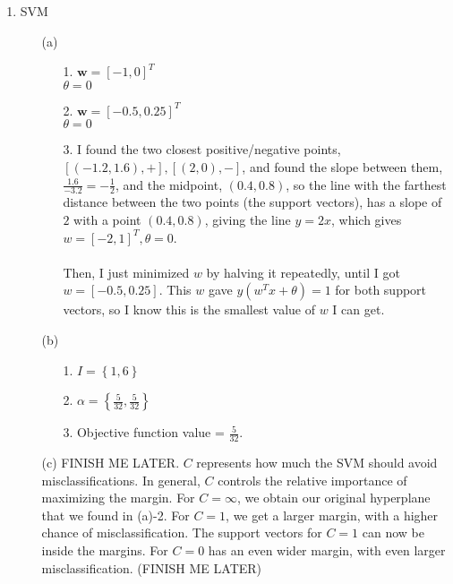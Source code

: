 

\oddsidemargin 0in
\evensidemargin 0in
\textwidth 6.5in
\topmargin -0.5in
\textheight 9.0in




\pagestyle{myheadings}  %

\begin{enumerate}
\item SVM
  \begin{enumerate}
  \item [(a)]
    \begin{enumerate}  
    \item [1.]
      $\textbf{w} = [-1,0]^T$\\
      $\theta = 0$
    \item [2.]
      $\textbf{w} = [-0.5,0.25]^T$\\
      $\theta = 0$
    \item [3.]
      I found the two closest positive/negative points, $[(-1.2,1.6), +], [(2,0), -]$, and found the slope between them, $\frac{1.6}{-3.2} = -\frac{1}{2}$, and the midpoint, $(0.4, 0.8)$, so the line with the farthest distance between the two points (the support vectors), has a slope of $2$ with a point $(0.4, 0.8)$, giving the line $y=2x$, which gives $w=[-2,1]^T, \theta=0$.\\\\
      Then, I just minimized $w$ by halving it repeatedly, until I got $w=[-0.5,0.25]$. This $w$ gave $y(w^Tx+\theta)=1$ for both support vectors, so I know this is the smallest value of $w$ I can get.      
    \end{enumerate}
  \item [(b)]
    \begin{enumerate}
    \item [1.]
      $I = \left\{1,6\right\}$
    \item [2.]
      $\alpha = \left\{\frac{5}{32},\frac{5}{32}\right\}$
    \item [3.]
      Objective function value = $\frac{5}{32}$.
    \end{enumerate}
  \item [(c)]
    FINISH ME LATER. $C$ represents how much the SVM should avoid misclassifications. In general, $C$ controls the relative importance of maximizing the margin. For $C=\infty$, we obtain our original hyperplane that we found in (a)-2. For $C=1$, we get a larger margin, with a higher chance of misclassification. The support vectors for $C=1$ can now be inside the margins. For $C=0$ has an even wider margin, with even larger misclassification. (FINISH ME LATER)

\end{enumerate}
\end{enumerate}
